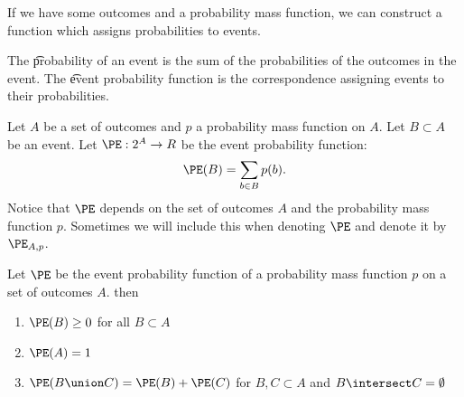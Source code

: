 
\sbasic









































\sstart
{}


If we have some outcomes and a probability mass function, we can construct a function which assigns probabilities to events.


The \t{probability} of an event is the sum of the probabilities of the outcomes in the event.
The \t{event probability function} is the correspondence assigning events to their probabilities.


Let $A$ be a set of outcomes and $p$ a probability mass function on $A$.
Let $B \subset A$ be an event.
Let $\PE: 2^A \to R$ be
the event probability function:
\[
  \PE(B) = \sum_{b \in B} p(b).
\]
Notice that $\PE$ depends on the set of
outcomes $A$ and the probability mass function
$p$. Sometimes we will include this when
denoting $\PE$ and denote it by $\PE_{A, p}$.


\begin{prop}
Let $\PE$ be the event probability function
of a probability mass function $p$ on a set
of outcomes $A$. then
\begin{enumerate}
\item $\PE(B) \geq 0$ for all $B \subset A$
\item $\PE(A) = 1$
\item
  $\PE(B \union C) = \PE(B) + \PE(C)$
  for $B, C \subset A$ and $B \intersect C = \emptyset$
\end{enumerate}
\end{prop}


\strats
